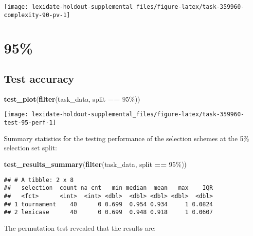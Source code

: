 \documentclass[
]{book}
\newenvironment{Shaded}{\begin{snugshade}}{\end{snugshade}}
\newcommand{\FunctionTok}[1]{\textcolor[rgb]{0.13,0.29,0.53}{\textbf{#1}}}
\newcommand{\NormalTok}[1]{#1}
\newcommand{\SpecialCharTok}[1]{\textcolor[rgb]{0.81,0.36,0.00}{\textbf{#1}}}
\newcommand{\StringTok}[1]{\textcolor[rgb]{0.31,0.60,0.02}{#1}}
\begin{document}
\texttt{[image: lexidate-holdout-supplemental\_files/figure-latex/task-359960-complexity-90-pv-1]}

\hypertarget{section-49}{%
\section{95\%}\label{section-49}}

\hypertarget{test-accuracy-49}{%
\subsection{Test accuracy}\label{test-accuracy-49}}

\begin{Shaded}
\begin{Highlighting}[]
\FunctionTok{test\_plot}\NormalTok{(}\FunctionTok{filter}\NormalTok{(task\_data, split }\SpecialCharTok{==} \StringTok{\textquotesingle{}95\%\textquotesingle{}}\NormalTok{))}
\end{Highlighting}
\end{Shaded}

\texttt{[image: lexidate-holdout-supplemental\_files/figure-latex/task-359960-test-95-perf-1]}

Summary statistics for the testing performance of the selection schemes at the 5\% selection set split:

\begin{Shaded}
\begin{Highlighting}[]
\FunctionTok{test\_results\_summary}\NormalTok{(}\FunctionTok{filter}\NormalTok{(task\_data, split }\SpecialCharTok{==} \StringTok{\textquotesingle{}95\%\textquotesingle{}}\NormalTok{))}
\end{Highlighting}
\end{Shaded}

\begin{verbatim}
## # A tibble: 2 x 8
##   selection  count na_cnt   min median  mean   max    IQR
##   <fct>      <int>  <int> <dbl>  <dbl> <dbl> <dbl>  <dbl>
## 1 tournament    40      0 0.699  0.954 0.934     1 0.0824
## 2 lexicase      40      0 0.699  0.948 0.918     1 0.0607
\end{verbatim}

The permutation test revealed that the results are:
\end{document}
